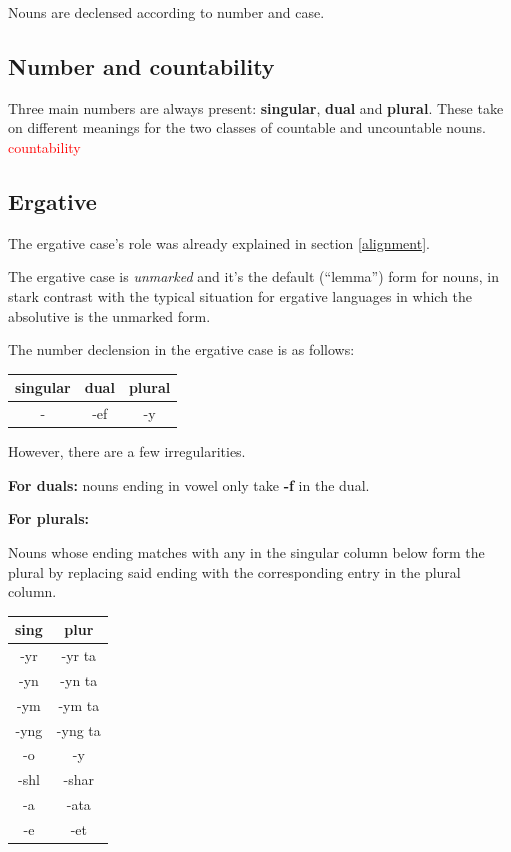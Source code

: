 \documentclass[10pt,oneside]{memoir}
\newcommand{\cmmnt}[1]{\textcolor{red}{#1}}
\begin{document}
\begin{multicols}{2}

Nouns are declensed according to number and case. 

\subsection{Number and countability}

Three main numbers are always present: \textbf{singular}, \textbf{dual} and \textbf{plural}. These take on different meanings for the two classes of countable and uncountable nouns. \cmmnt{countability}


\subsection{Ergative}

The ergative case's role was already explained in section \ref{alignment}.

The ergative case is \emph{unmarked} and it's the default (``lemma'') form for nouns, in stark contrast with the typical situation for ergative languages in which the absolutive is the unmarked form.

The number declension in the ergative case is as follows:

\begin{center}
    \begin{tabular}[]{ c| c| c }
             singular & dual & plural\\
            \hline
             -        & -ef  & -y
    \end{tabular}
\end{center}

However, there are a few irregularities.

\textbf{For duals:} nouns ending in vowel only take \textbf{-f} in the dual.

\textbf{For plurals:}

Nouns whose ending matches with any in the singular column below form the plural by replacing said ending with the corresponding entry in the plural column.


\begin{center}
\begin{tabular}[]{c |c}
    \textbf{sing} & \textbf{plur}\\
    \hline
    -yr & -yr ta\\
    -yn & -yn ta\\
    -ym & -ym ta\\
    -yng & -yng ta\\
    -o & -y\\
    -shl & -shar\\
    -a  & -ata\\
    -e & -et\\


\end{tabular}
\end{center}
\end{multicols}
\end{document}

